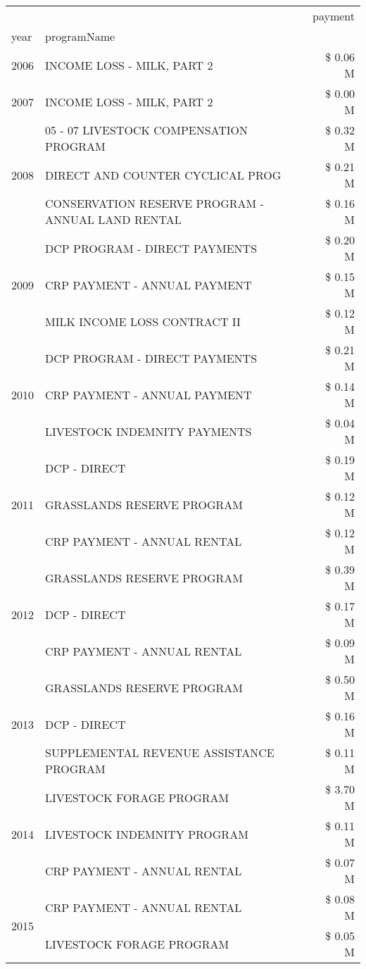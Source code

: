 \begin{tabular}{llr}
\toprule
 &  & payment \\
year & programName &  \\
\midrule
2006 & INCOME LOSS - MILK, PART 2 & \$ 0.06 M \\
\cline{1-3}
2007 & INCOME LOSS - MILK, PART 2 & \$ 0.00 M \\
\cline{1-3}
\multirow[t]{3}{*}{2008} & 05 - 07 LIVESTOCK COMPENSATION PROGRAM & \$ 0.32 M \\
 & DIRECT AND COUNTER CYCLICAL PROG & \$ 0.21 M \\
 & CONSERVATION RESERVE PROGRAM - ANNUAL LAND RENTAL & \$ 0.16 M \\
\cline{1-3}
\multirow[t]{3}{*}{2009} & DCP PROGRAM - DIRECT PAYMENTS & \$ 0.20 M \\
 & CRP PAYMENT - ANNUAL PAYMENT & \$ 0.15 M \\
 & MILK INCOME LOSS CONTRACT II & \$ 0.12 M \\
\cline{1-3}
\multirow[t]{3}{*}{2010} & DCP PROGRAM - DIRECT PAYMENTS & \$ 0.21 M \\
 & CRP PAYMENT - ANNUAL PAYMENT & \$ 0.14 M \\
 & LIVESTOCK INDEMNITY PAYMENTS & \$ 0.04 M \\
\cline{1-3}
\multirow[t]{3}{*}{2011} & DCP - DIRECT & \$ 0.19 M \\
 & GRASSLANDS RESERVE PROGRAM & \$ 0.12 M \\
 & CRP PAYMENT - ANNUAL RENTAL & \$ 0.12 M \\
\cline{1-3}
\multirow[t]{3}{*}{2012} & GRASSLANDS RESERVE PROGRAM & \$ 0.39 M \\
 & DCP - DIRECT & \$ 0.17 M \\
 & CRP PAYMENT - ANNUAL RENTAL & \$ 0.09 M \\
\cline{1-3}
\multirow[t]{3}{*}{2013} & GRASSLANDS RESERVE PROGRAM & \$ 0.50 M \\
 & DCP - DIRECT & \$ 0.16 M \\
 & SUPPLEMENTAL REVENUE ASSISTANCE PROGRAM & \$ 0.11 M \\
\cline{1-3}
\multirow[t]{3}{*}{2014} & LIVESTOCK FORAGE PROGRAM & \$ 3.70 M \\
 & LIVESTOCK INDEMNITY PROGRAM & \$ 0.11 M \\
 & CRP PAYMENT - ANNUAL RENTAL & \$ 0.07 M \\
\cline{1-3}
\multirow[t]{3}{*}{2015} & CRP PAYMENT - ANNUAL RENTAL & \$ 0.08 M \\
 & LIVESTOCK FORAGE PROGRAM & \$ 0.05 M \\

\end{tabular}
